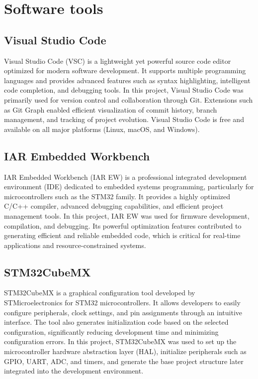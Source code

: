 \section{Software tools}

\subsection{Visual Studio Code}
\hspace{1cm}Visual Studio Code (VSC) is a lightweight yet powerful source code editor optimized for modern software development. It supports multiple programming languages and provides advanced features such as syntax highlighting, intelligent code completion, and debugging tools. In this project, Visual Studio Code was primarily used for version control and collaboration through Git. Extensions such as Git Graph enabled efficient visualization of commit history, branch management, and tracking of project evolution. Visual Studio Code is free and available on all major platforms (Linux, macOS, and Windows)\cite{20}.

\subsection{IAR Embedded Workbench}
\hspace{1cm}IAR Embedded Workbench (IAR EW) is a professional integrated development environment (IDE) dedicated to embedded systems programming, particularly for microcontrollers such as the STM32 family. It provides a highly optimized C/C++ compiler, advanced debugging capabilities, and efficient project management tools. In this project, IAR EW was used for firmware development, compilation, and debugging. Its powerful optimization features contributed to generating efficient and reliable embedded code, which is critical for real-time applications and resource-constrained systems\cite{21}.

\subsection{STM32CubeMX}
\hspace{1cm}STM32CubeMX is a graphical configuration tool developed by STMicroelectronics for STM32 microcontrollers. It allows developers to easily configure peripherals, clock settings, and pin assignments through an intuitive interface. The tool also generates initialization code based on the selected configuration, significantly reducing development time and minimizing configuration errors. In this project, STM32CubeMX was used to set up the microcontroller hardware abstraction layer (HAL), initialize peripherals such as GPIO, UART, ADC, and timers, and generate the base project structure later integrated into the development environment\cite{22}.

